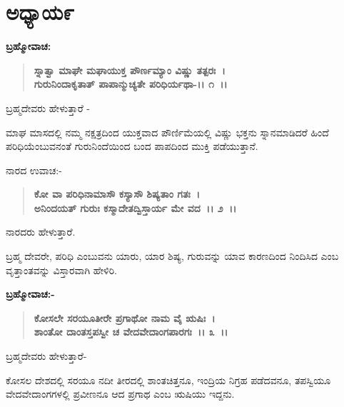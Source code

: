 \newpage

\section*{ಅಧ್ಯಾಯ\enginline{-}೯}

\begin{flushleft}
\textbf{ಬ್ರಹ್ಮೋವಾಚ:\enginline{-} }
\end{flushleft}

\begin{verse}
\textbf{ಸ್ನಾತ್ವಾ ಮಾಘೇ ಮಘಾಯುಕ್ತ ಪೌರ್ಣಮ್ಯಾಂ ವಿಷ್ಣು ತತ್ಪರಃ~।}\\\textbf{ಗುರುನಿಂದಾಕೃತಾತ್ ಪಾಪಾನ್ಮುಚ್ಯತೇ ಪರಿಧಿರ್ಯಥಾ-।। ೧~।।}
\end{verse}

\begin{flushleft}
ಬ್ರಹ್ಮದೇವರು ಹೇಳುತ್ತಾರೆ -
\end{flushleft}

ಮಾಘ ಮಾಸದಲ್ಲಿ ನಮ್ಮ ನಕ್ಷತ್ರದಿಂದ ಯುಕ್ತವಾದ ಪೌರ್ಣಿಮೆಯಲ್ಲಿ ವಿಷ್ಣು ಭಕ್ತನು ಸ್ನಾನಮಾಡಿದರೆ ಹಿಂದೆ ಪರಿಧಿಯೆಂಬುವನಂತೆ ಗುರುನಿಂದೆಯಿಂದ ಬಂದ ಪಾಪದಿಂದ ಮುಕ್ತಿ ಪಡೆಯುತ್ತಾನೆ. 

\noindent
ನಾರದ ಉವಾಚ:-

\begin{verse}
\textbf{ಕೋ ವಾ ಪರಿಧಿನಾಮಾಸೌ ಕಸ್ಯಾಸೌ ಶಿಷ್ಯತಾಂ ಗತಃ~।}\\\textbf{ಅನಿಂದಯತ್ ಗುರುಃ ಕಸ್ಮಾದೇತದ್ವಿಸ್ತಾರ್ಯ ಮೇ ವದ~।। ೨~।। }
\end{verse}

\begin{flushleft}
ನಾರದರು ಹೇಳುತ್ತಾರೆ.
\end{flushleft}

ಬ್ರಹ್ಮ ದೇವರೇ, ಪರಿಧಿ ಎಂಬುವನು ಯಾರು, ಯಾರ ಶಿಷ್ಯ, ಗುರುವನ್ನು ಯಾವ ಕಾರಣದಿಂದ ನಿಂದಿಸಿದ ಎಂಬ ವೃತ್ತಾಂತವನ್ನು ವಿಸ್ತಾರವಾಗಿ ಹೇಳಿರಿ.

\begin{flushleft}
\textbf{ಬ್ರಹ್ಮೋವಾಚ:- }
\end{flushleft}

\begin{verse}
\textbf{ಕೋಸಲೇ ಸರಯೂತೀರೇ ಪ್ರಗಾಥೋ ನಾಮ ವೈ ಋಷಿಃ~।}\\\textbf{ಶಾಂತೋ ದಾಂತಸ್ತಪಸ್ವೀ ಚ ವೇದವೇದಾಂಗಪಾರಗಃ~।। ೩~।।}
\end{verse}

\begin{flushleft}
ಬ್ರಹ್ಮದೇವರು ಹೇಳುತ್ತಾರೆ-
\end{flushleft}

ಕೋಸಲ ದೇಶದಲ್ಲಿ ಸರಯೂ ನದೀ ತೀರದಲ್ಲಿ ಶಾಂತಚಿತ್ತನೂ, ಇಂದ್ರಿಯ ನಿಗ್ರಹ ಪಡೆದವನೂ, ತಪಸ್ವಿಯೂ ವೇದವೇದಾಂಗಗಳಲ್ಲಿ ಪ್ರವೀಣನೂ ಆದ ಪ್ರಗಾಥ ಎಂಬ ಋಷಿಯು ಇದ್ದನು.

